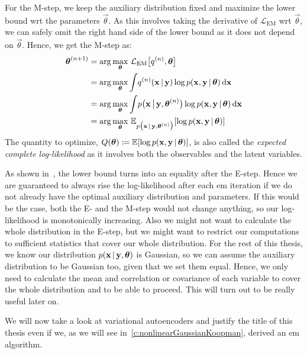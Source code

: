 	For the M-step, we keep the auxiliary distribution fixed and maximize the lower bound \ac{wrt} the parameters \(\vec{\theta}\). As this involves taking the derivative of \(\mathcal{L}_\mathrm{EM}\) \ac{wrt} \(\vec{\theta}\), we can safely omit the right hand side of the lower bound as it does not depend on \(\vec{\theta}\). Hence, we get the M-step as:
	\begin{align*}
		\boldsymbol{\mathrm{\theta}}^{(n + 1)}
			&= \arg\max_{\boldsymbol{\mathrm{\theta}}}\, \mathcal{L}_\mathrm{EM}\big[ q^{(n)}, \boldsymbol{\mathrm{\theta}} \big] \\
			&= \arg\max_{\boldsymbol{\mathrm{\theta}}} \int\! q^{(n)}(\boldsymbol{\mathrm{x}} \,\vert\, \boldsymbol{\mathrm{y}}) \log p(\boldsymbol{\mathrm{x}}, \boldsymbol{\mathrm{y}} \,\vert\, \boldsymbol{\mathrm{\theta}}) \dd{\boldsymbol{\mathrm{x}}} \\
			&= \arg\max_{\boldsymbol{\mathrm{\theta}}} \int\! p\big(\boldsymbol{\mathrm{x}} \,\big\vert\, \boldsymbol{\mathrm{y}}, \boldsymbol{\mathrm{\theta}}^{(n)}\big) \log p(\boldsymbol{\mathrm{x}}, \boldsymbol{\mathrm{y}} \,\vert\, \boldsymbol{\mathrm{\theta}}) \dd{\boldsymbol{\mathrm{x}}} \\
			&= \arg\max_{\boldsymbol{\mathrm{\theta}}}\, \mathbb{E}_{p\big(\boldsymbol{\mathrm{x}} \,\vert\, \boldsymbol{\mathrm{y}}, \boldsymbol{\mathrm{\theta}}^{(n)}\big)}[\log p(\boldsymbol{\mathrm{x}}, \boldsymbol{\mathrm{y}} \,\vert\, \boldsymbol{\mathrm{\theta}})]
	\end{align*}
	The quantity to optimize, \( Q(\boldsymbol{\mathrm{\theta}}) \coloneqq \mathbb{E}[\log p(\boldsymbol{\mathrm{x}}, \boldsymbol{\mathrm{y}} \,\vert\, \boldsymbol{\mathrm{\theta}})] \), is also called the \emph{expected complete log-likelihood} as it involves both the observables and the latent variables.

	As shown in~\cite{bealVariationalAlgorithmsApproximate2003a}, the lower bound turns into an equality after the E-step. Hence we are guaranteed to always rise the log-likelihood after each \ac{em} iteration if we do not already have the optimal auxiliary distribution and parameters. If this would be the case, both the E- and the M-step would not change anything, so our log-likelihood is monotonically increasing. Also we might not want to calculate the whole distribution in the E-step, but we might want to restrict our computations to sufficient statistics that cover our whole distribution. For the rest of this thesis, we know our distribution \( p(\boldsymbol{\mathrm{x}} \,\vert\, \boldsymbol{\mathrm{y}}, \boldsymbol{\mathrm{\theta}}) \) is Gaussian, so we can assume the auxiliary distribution to be Gaussian too, given that we set them equal. Hence, we only need to calculate the mean and correlation or covariance of each variable to cover the whole distribution and to be able to proceed. This will turn out to be really useful later on.

	We will now take a look at variational autoencoders and justify the title of this thesis even if we, as we will see in~\autoref{c:nonlinearGaussianKoopman}, derived an \ac{em} algorithm.

